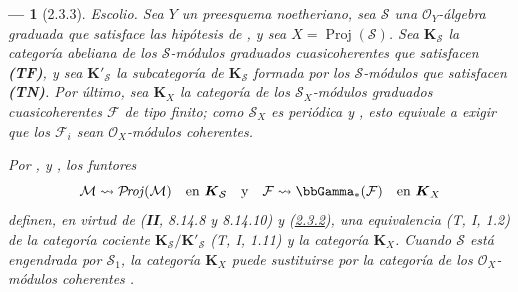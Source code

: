 \documentclass[10pt,oneside,openany]{book}
\theoremstyle{egaenv}\newtheorem*{env}{---}
\theoremstyle{egastatement}
\theoremstyle{egadescription}
\providecommand{\shProj}{\mathcal{P}\!\mathit{roj}}
\begin{document}
\begin{env}[2.3.3]
\label{III.2.3.3}
\label{III.2.3.3-fr}
\emph{Escolio.}
Sea $Y$ un preesquema noetheriano, sea $\mathcal S$ una $\mathcal O_Y$-álgebra graduada que satisface las hipótesis de , y sea $X=\operatorname{Proj}(\mathcal S)$.
Sea $\boldsymbol{K}_{\mathcal S}$ la categoría abeliana de los $\mathcal S$-módulos graduados cuasicoherentes que satisfacen \textbf{(TF)}, y sea $\boldsymbol{K}'_{\mathcal S}$ la subcategoría de $\boldsymbol{K}_{\mathcal S}$ formada por los $\mathcal S$-módulos que satisfacen \textbf{(TN)}.
Por último, sea $\boldsymbol{K}_X$ la categoría de los $\mathcal S_X$-módulos graduados cuasicoherentes $\mathcal F$ de tipo finito; como $\mathcal S_X$ es periódica  y , esto equivale a exigir que los $\mathcal F_i$ sean $\mathcal O_X$-módulos coherentes.

Por ,  y , los funtores
\[
\mathcal M\leadsto\shProj(\mathcal M)
\quad\text{en }\boldsymbol{K}_{\mathcal S}
\quad\text{y}\quad
\mathcal F\leadsto\bbGamma_*(\mathcal F)
\quad\text{en }\boldsymbol{K}_X
\] definen, en virtud de (\textbf{II}, 8.14.8 y 8.14.10) y (\hyperref[III.2.3.2-fr]{2.3.2}), \emph{una equivalencia} (T, I, 1.2) \emph{de la categoría cociente} $\boldsymbol{K}_{\mathcal S}/\boldsymbol{K}'_{\mathcal S}$
(T, I, 1.11) \emph{y la categoría} $\boldsymbol{K}_X$.
Cuando $\mathcal S$ está engendrada por $\mathcal S_1$, la categoría $\boldsymbol{K}_X$ puede sustituirse por la categoría de los $\mathcal O_X$-módulos coherentes .
\end{env}
\end{document}
